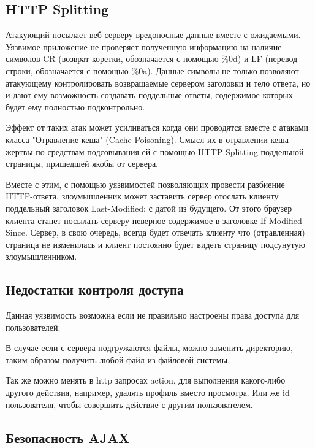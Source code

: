 \documentclass{article}
\begin{document}
\subsection{HTTP Splitting}

Атакующий посылает веб-серверу вредоносные данные вместе с ожидаемыми. Уязвимое приложение не проверяет полученную
информацию на наличие символов CR (возврат коретки, обозначается с помощью \%0d) и LF (перевод строки, обозначается
с помощью \%0a). Данные символы не только позволяют атакующему контролировать возвращаемые сервером заголовки и тело ответа,
но и дают ему возможность создавать поддельные ответы, содержимое которых будет ему полностью подконтрольно.

Эффект от таких атак может усиливаться когда они проводятся вместе с атаками класса "Отравление кеша" (Cache Poisoning).
Смысл их в отравлении кеша жертвы по средствам подсовывания ей с помощью HTTP Splitting поддельной страницы,
пришедшей якобы от сервера.

Вместе с этим, с помощью уязвимостей позволяющих провести разбиение HTTP-ответа, злоумышленник может заставить сервер
отослать клиенту поддельный заголовок Last-Modified: с датой из будущего. От этого браузер клиента станет посылать серверу
неверное содержимое в заголовке If-Modified-Since. Сервер, в свою очередь, всегда будет отвечать клиенту что (отравленная)
страница не изменилась и клиент постоянно будет видеть страницу подсунутую злоумышленником.



\subsection{Недостатки контроля доступа}

Данная уязвимость возможна если не правильно настроены права доступа для пользователей.

В случае если с сервера подгружаются файлы, можно заменить директорию, таким образом получить любой файл из файловой системы.

Так же можно менять в http запросах action, для выполнения какого-либо другого действия, например, удалять профиль вместо просмотра.
Или же id пользователя, чтобы совершить действие с другим пользователем.



\subsection{Безопасность AJAX}
\end{document}
